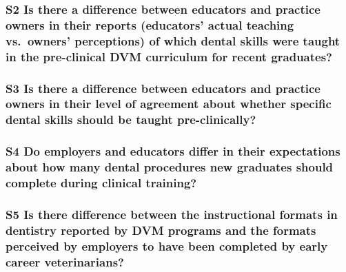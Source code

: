 \documentclass[
  11pt,
  letterpaper,
  DIV=11,
  numbers=noendperiod]{scrartcl}
\numberwithin{figure}{section}
\begin{document}
\hypertarget{s2-is-there-a-difference-between-educators-and-practice-owners-in-their-reports-educators-actual-teaching-vs.-owners-perceptions-of-which-dental-skills-were-taught-in-the-pre-clinical-dvm-curriculum-for-recent-graduates}{%
\subsubsection{S2 Is there a difference between educators and practice
owners in their reports (educators' actual teaching vs.~owners'
perceptions) of which dental skills were taught in the pre-clinical DVM
curriculum for recent
graduates?}\label{s2-is-there-a-difference-between-educators-and-practice-owners-in-their-reports-educators-actual-teaching-vs.-owners-perceptions-of-which-dental-skills-were-taught-in-the-pre-clinical-dvm-curriculum-for-recent-graduates}}

\hypertarget{s3-is-there-a-difference-between-educators-and-practice-owners-in-their-level-of-agreement-about-whether-specific-dental-skills-should-be-taught-pre-clinically}{%
\subsubsection{S3 Is there a difference between educators and practice
owners in their level of agreement about whether specific dental skills
should be taught
pre-clinically?}\label{s3-is-there-a-difference-between-educators-and-practice-owners-in-their-level-of-agreement-about-whether-specific-dental-skills-should-be-taught-pre-clinically}}

\hypertarget{s4-do-employers-and-educators-differ-in-their-expectations-about-how-many-dental-procedures-new-graduates-should-complete-during-clinical-training}{%
\subsubsection{S4 Do employers and educators differ in their
expectations about how many dental procedures new graduates should
complete during clinical
training?}\label{s4-do-employers-and-educators-differ-in-their-expectations-about-how-many-dental-procedures-new-graduates-should-complete-during-clinical-training}}

\hypertarget{s5-is-there-difference-between-the-instructional-formats-in-dentistry-reported-by-dvm-programs-and-the-formats-perceived-by-employers-to-have-been-completed-by-early-career-veterinarians}{%
\subsubsection{S5 Is there difference between the instructional formats
in dentistry reported by DVM programs and the formats perceived by
employers to have been completed by early career
veterinarians?}\label{s5-is-there-difference-between-the-instructional-formats-in-dentistry-reported-by-dvm-programs-and-the-formats-perceived-by-employers-to-have-been-completed-by-early-career-veterinarians}}
\end{document}
